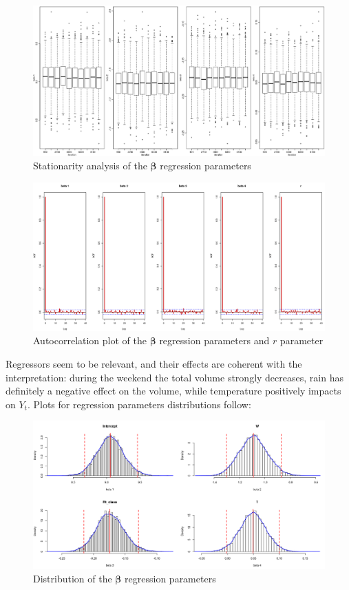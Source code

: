 \documentclass[11pt,twoside]{report}
\begin{document}
\begin{figure}[H]
	\centering
	\includegraphics[width=160 mm]{pictures/negbin_single_r_stat.png}
	\caption{Stationarity analysis of the $\boldsymbol{\beta}$ regression parameters}
	\label{fig:nb_stat}
\end{figure}
\begin{figure}[H]
	\centering
	\includegraphics[width=160 mm]{pictures/negbin_single_r_acf.png}
	\caption{Autocorrelation plot of the $\boldsymbol{\beta}$ regression parameters and $r$ parameter}
	\label{fig:nb_acf}
\end{figure}
Regressors seem to be relevant, and their effects are coherent with the interpretation: during the weekend the total volume strongly decreases, rain has definitely a negative effect on the volume, while temperature positively impacts on $Y_t$.
Plots for regression parameters distributions follow:
\begin{figure}[H]
	\centering
	\includegraphics[width=160 mm]{pictures/negbin_single_r_beta.png}
	\caption{Distribution of the $\boldsymbol{\beta}$ regression parameters}
	\label{fig:nb_beta}
\end{figure}
\end{document}
